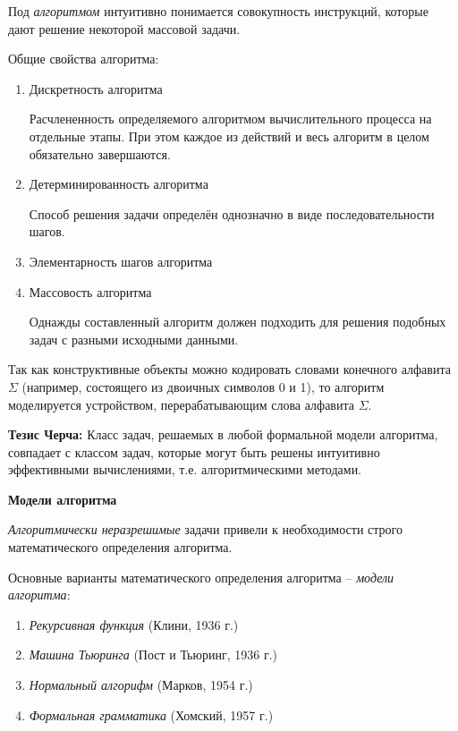 Под \textit{алгоритмом} интуитивно понимается совокупность инструкций, которые дают решение некоторой массовой задачи.

Общие свойства алгоритма:
\begin{enumerate}
    \item Дискретность алгоритма
    
    Расчлененность определяемого алгоритмом вычислительного процесса на отдельные этапы. При этом каждое из действий и весь алгоритм в целом обязательно завершаются.
    \item Детерминированность алгоритма

    Способ решения задачи определён однозначно в виде последовательности шагов.
    \item Элементарность шагов алгоритма
    \item Массовость алгоритма 

    Однажды составленный алгоритм должен подходить для решения подобных задач с разными исходными данными.
\end{enumerate}

Так как конструктивные объекты можно кодировать словами конечного алфавита $\varSigma$  (например, состоящего из двоичных символов 0 и 1), то алгоритм моделируется устройством, перерабатывающим слова алфавита $\varSigma$.

\textbf{Тезис Черча:}
Класс задач, решаемых в любой формальной модели алгоритма, совпадает с классом задач, которые могут быть решены интуитивно эффективными вычислениями, т.е. алгоритмическими методами.

\textbf{Модели алгоритма}

\textit{Алгоритмически неразрешимые} задачи привели к необходимости строго математического определения алгоритма.

Основные варианты математического определения алгоритма -- \textit{модели алгоритма}:

\begin{enumerate}
    \item \textit{Рекурсивная функция} (Клини, 1936 г.)
    \item \textit{Машина Тьюринга} (Пост и Тьюринг, 1936 г.)
    \item \textit{Нормальный алгорифм} (Марков, 1954 г.)
    \item \textit{Формальная грамматика} (Хомский, 1957 г.)
\end{enumerate}